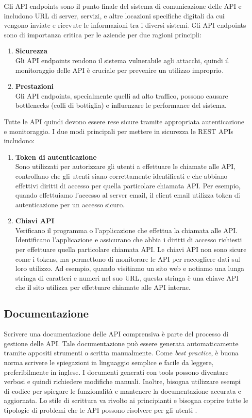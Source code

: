 Gli API endpoints sono il punto finale del sistema di comunicazione delle API e includono URL di server, servizi, e altre locazioni specifiche digitali da cui vengono inviate e ricevute le informazioni tra i diversi sistemi. Gli API endpoints sono di importanza critica per le aziende per due ragioni principli:
\begin{enumerate}
    \item \textbf{Sicurezza}\\
    Gli API endpoints rendono il sistema vulnerabile agli attacchi, quindi il monitoraggio delle API è cruciale per prevenire un utilizzo improprio.
    \item \textbf{Prestazioni}\\
    Gli API endpoints, specialmente quelli ad alto traffico, possono causare bottlenecks (colli di bottiglia) e influenzare le performance del sistema.
\end{enumerate}

Tutte le API quindi devono essere rese sicure tramite appropriata autenticazione e monitoraggio. I due modi principali per mettere in sicurezza le REST APIs includono:
\begin{enumerate}
    \item \textbf{Token di autenticazione}\\
    Sono utilizzati per autorizzare gli utenti a effettuare le chiamate alle API, controllano che gli utenti siano correttamente identificati e che abbiano effettivi diritti di accesso per quella particolare chiamata API. Per esempio, quando effettuiamo l'accesso al server email, il client email utilizza token di autenticazione per un accesso sicuro.
    \item \textbf{Chiavi API}\\
    Verificano il programma o l'applicazione che effettua la chiamata alle API. Identificano l'applicazione e assicurano che abbia i diritti di accesso richiesti per effettuare quella particolare chiamata API. Le chiavi API non sono sicure come i tokens, ma permettono di monitorare le API per raccogliere dati sul loro utilizzo. Ad esempio, quando visitiamo un sito web e notiamo una lunga stringa di caratteri e numeri nel suo URL, questa stringa è una chiave API che il sito utilizza per effettuare chiamate alle API interne.
\end{enumerate}

\subsection{Documentazione}
Scrivere una documentazione delle API comprensiva è parte del processo di gestione delle API. Tale documentazione può essere generata automaticamente tramite appositi strumenti o scritta manualmente. Come \textit{best practice}, è buona norma scrivere le spiegazioni in linguaggio semplice e facile da leggere, preferibilmente in inglese. I documenti generati con tools possono diventare verbosi e quindi richiedere modifiche manuali. Inoltre, bisogna utilizzare esempi di codice per spiegare le funzionalità e mantenere la documentazione accurata e aggiornata. Lo stile di scrittura va rivolto ai principianti e bisogna coprire tutte le tipologie di problemi che le API possono risolvere per gli utenti \cite{API_AWS}.

